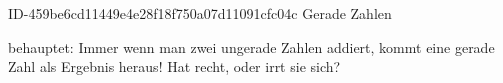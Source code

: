 \begin{exercise}
      {ID-459be6cd11449e4e28f18f750a07d11091cfc04c}
      {Gerade Zahlen}
  \ifproblem\problem\par
    \xxa{} behauptet: \glqq Immer wenn man zwei ungerade Zahlen addiert, kommt eine
    gerade Zahl als Ergebnis heraus!\grqq{} Hat \xxa{} recht, oder irrt sie sich?
  \fi
\end{exercise}
